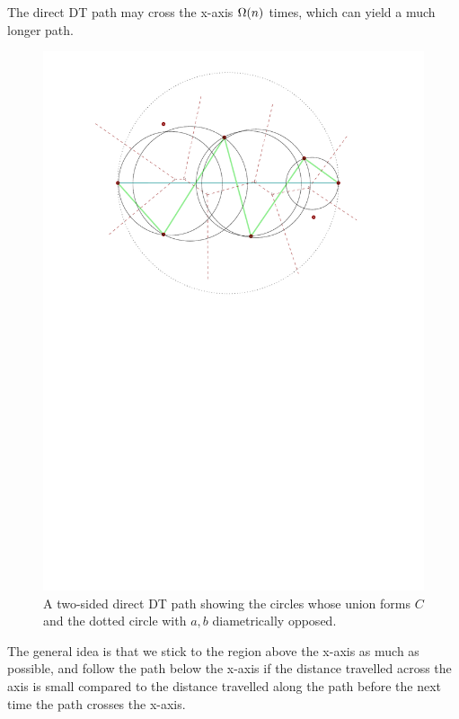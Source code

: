\documentclass{tufte-handout}
\begin{document}
The direct DT path may cross the x-axis $\Omega\!\left(n\right)$ times,
which can yield a much longer path.

\begin{figure}
  \includegraphics[scale=1.0]{figures/two_sided_path_center_circles.pdf}
  \caption{A two-sided direct DT path showing the circles whose union
    forms $C$ and the dotted circle with $a,b$ diametrically
    opposed.}
\end{figure}

The general idea is that we stick to the region above the x-axis as
much as possible, and follow the path below the x-axis if the distance
travelled across the axis is small compared to the distance travelled
along the path before the next time the path crosses the x-axis.

\newpage
\end{document}
